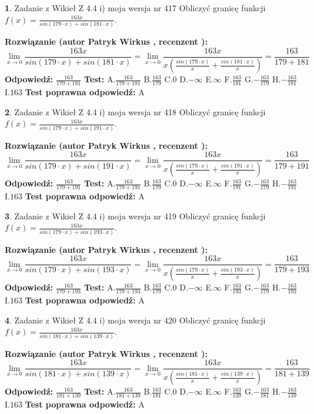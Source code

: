 \documentclass[12pt, a4paper]{article}
\theoremstyle{definition} %
\newtheorem{zad}{}
\newcommand{\zadStart}[1]{\begin{zad}#1\newline}
\newcommand{\zadStop}{\end{zad}}
\newcommand{\rozwStart}[2]{\noindent \textbf{Rozwiązanie (autor #1 , recenzent #2): }\newline}
\newcommand{\rozwStop}{\newline}
\newcommand{\odpStart}{\noindent \textbf{Odpowiedź:}\newline}
\newcommand{\odpStop}{\newline}
\newcommand{\testStart}{\noindent \textbf{Test:}\newline}
\newcommand{\testStop}{\newline}
\newcommand{\kluczStart}{\noindent \textbf{Test poprawna odpowiedź:}\newline}
\newcommand{\kluczStop}{\newline}
\begin{document}
\zadStart{Zadanie z Wikieł Z 4.4 i) moja wersja nr 417}
Obliczyć granicę funkcji $f(x)=\frac{163x}{sin(179\cdot x) +sin(181\cdot x)}$.
\zadStop
\rozwStart{Patryk Wirkus}{}
$$\lim\limits_{x\to 0}\frac{163x}{sin(179\cdot x) +sin(181\cdot x)}=\lim\limits_{x\to 0}\frac{163x}{x(\frac{sin(179\cdot x)}{x}+\frac{sin(181\cdot x)}{x})}=\frac{163}{179+181}$$
\rozwStop
\odpStart
$\frac{163}{179+181}$
\odpStop
\testStart
A.$\frac{163}{179+181}$
B.$\frac{163}{179}$
C.$0$
D.$-\infty$
E.$\infty$
F.$\frac{163}{181}$
G.$-\frac{163}{179}$
H.$-\frac{163}{181}$
I.$163$
\testStop
\kluczStart
A
\kluczStop



\zadStart{Zadanie z Wikieł Z 4.4 i) moja wersja nr 418}
Obliczyć granicę funkcji $f(x)=\frac{163x}{sin(179\cdot x) +sin(191\cdot x)}$.
\zadStop
\rozwStart{Patryk Wirkus}{}
$$\lim\limits_{x\to 0}\frac{163x}{sin(179\cdot x) +sin(191\cdot x)}=\lim\limits_{x\to 0}\frac{163x}{x(\frac{sin(179\cdot x)}{x}+\frac{sin(191\cdot x)}{x})}=\frac{163}{179+191}$$
\rozwStop
\odpStart
$\frac{163}{179+191}$
\odpStop
\testStart
A.$\frac{163}{179+191}$
B.$\frac{163}{179}$
C.$0$
D.$-\infty$
E.$\infty$
F.$\frac{163}{191}$
G.$-\frac{163}{179}$
H.$-\frac{163}{191}$
I.$163$
\testStop
\kluczStart
A
\kluczStop



\zadStart{Zadanie z Wikieł Z 4.4 i) moja wersja nr 419}
Obliczyć granicę funkcji $f(x)=\frac{163x}{sin(179\cdot x) +sin(193\cdot x)}$.
\zadStop
\rozwStart{Patryk Wirkus}{}
$$\lim\limits_{x\to 0}\frac{163x}{sin(179\cdot x) +sin(193\cdot x)}=\lim\limits_{x\to 0}\frac{163x}{x(\frac{sin(179\cdot x)}{x}+\frac{sin(193\cdot x)}{x})}=\frac{163}{179+193}$$
\rozwStop
\odpStart
$\frac{163}{179+193}$
\odpStop
\testStart
A.$\frac{163}{179+193}$
B.$\frac{163}{179}$
C.$0$
D.$-\infty$
E.$\infty$
F.$\frac{163}{193}$
G.$-\frac{163}{179}$
H.$-\frac{163}{193}$
I.$163$
\testStop
\kluczStart
A
\kluczStop



\zadStart{Zadanie z Wikieł Z 4.4 i) moja wersja nr 420}
Obliczyć granicę funkcji $f(x)=\frac{163x}{sin(181\cdot x) +sin(139\cdot x)}$.
\zadStop
\rozwStart{Patryk Wirkus}{}
$$\lim\limits_{x\to 0}\frac{163x}{sin(181\cdot x) +sin(139\cdot x)}=\lim\limits_{x\to 0}\frac{163x}{x(\frac{sin(181\cdot x)}{x}+\frac{sin(139\cdot x)}{x})}=\frac{163}{181+139}$$
\rozwStop
\odpStart
$\frac{163}{181+139}$
\odpStop
\testStart
A.$\frac{163}{181+139}$
B.$\frac{163}{181}$
C.$0$
D.$-\infty$
E.$\infty$
F.$\frac{163}{139}$
G.$-\frac{163}{181}$
H.$-\frac{163}{139}$
I.$163$
\testStop
\kluczStart
A
\kluczStop
\end{document}
